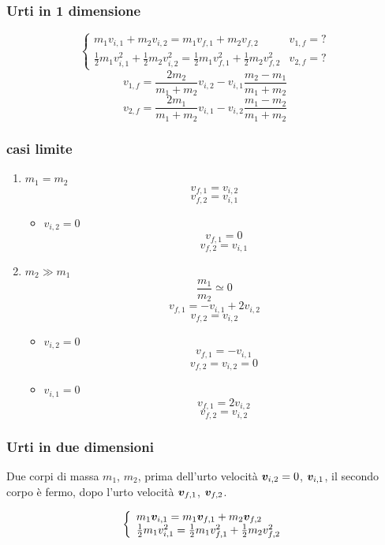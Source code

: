 \subsubsection{Urti in 1 dimensione}

\[ \left \{
  \begin{array}{ll}
    m_1v_{i,1}+m_2v_{i,2}=m_1v_{f,1}+m_2v_{f,2}                                                     & v_{1,f}=? \\
    \frac{1}{2}m_1v_{i,1}^2+\frac{1}{2}m_2v_{i,2}^2=\frac{1}{2}m_1v_{f,1}^2+\frac{1}{2}m_2v_{f,2}^2 & v_{2,f}=?
  \end{array}
  \right.\]
\[v_{1,f}=\frac{2m_2}{m_1+m_2}v_{i,2}-v_{i,1}\frac{m_2-m_1}{m_1+m_2}\]
\[v_{2,f}=\frac{2m_1}{m_1+m_2}v_{i,1}-v_{i,2}\frac{m_1-m_2}{m_1+m_2}\]

\subsubsection{casi limite}
\label{casilimiteurti}
\begin{enumerate}
  \item $m_1=m_2$
        \[v_{f,1}=v_{i,2}\]
        \[v_{f,2}=v_{i,1}\]
        \begin{itemize}
          \item $v_{i,2}=0$
                \[v_{f,1}=0\]
                \[v_{f,2}=v_{i,1}\]
        \end{itemize}
  \item $m_2\gg m_1$
        \[\frac{m_1}{m_2}\simeq 0\]
        \[v_{f,1}=-v_{i,1}+2v_{i,2}\]
        \[v_{f,2}=v_{i,2}\]
        \begin{itemize}
          \item $v_{i,2}=0$
                \[v_{f,1}=-v_{i,1}\]
                \[v_{f,2}=v_{i,2}=0\]
          \item $v_{i,1}=0$
                \[v_{f,1}=2v_{i,2}\]
                \[v_{f,2}=v_{i,2}\]
        \end{itemize}

\end{enumerate}

\subsubsection{Urti in due dimensioni}
Due corpi di massa $m_1$, $m_2$, prima dell'urto velocità $\boldsymbol{v}_{i,2}=0$, $\boldsymbol{v}_{i,1}$, il secondo corpo è fermo, dopo l'urto velocità $\boldsymbol{v}_{f,1}$, $\boldsymbol{v}_{f,2}$.

\[\left\{
  \begin{array}{l}
    m_1\boldsymbol{v}_{i,1}=m_1\boldsymbol{v}_{f,1}+m_2\boldsymbol{v}_{f,2} \\
    \frac{1}{2}m_1 v_{i,1}^2=\frac{1}{2}m_1 v_{f,1}^2+\frac{1}{2}m_2
    v_{f,2}^2
  \end{array}\right.\]

